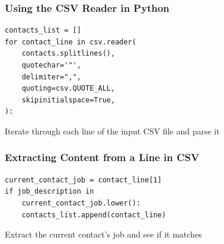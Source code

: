 \documentclass[14pt,aspectratio=169]{beamer}
\begin{document}
%
\begin{frame}[fragile]
  \frametitle{Using the CSV Reader in Python}
  \normalsize
  \begin{minipage}{6in}
    \vspace*{.25in}
    \begin{verbatim}
contacts_list = []
for contact_line in csv.reader(
    contacts.splitlines(),
    quotechar='"',
    delimiter=",",
    quoting=csv.QUOTE_ALL,
    skipinitialspace=True,
):
    \end{verbatim}
  \end{minipage}
  \vspace*{.1in}
  \begin{center}
    \normalsize \noindent Iterate through each line of the input CSV file and
    parse it\\
  \end{center}
\end{frame}

%
\begin{frame}[fragile]
  \frametitle{Extracting Content from a Line in CSV}
  \normalsize
  \begin{minipage}{6in}
    \vspace*{.25in}
    \begin{verbatim}
current_contact_job = contact_line[1]
if job_description in
    current_contact_job.lower():
    contacts_list.append(contact_line)
    \end{verbatim}
  \end{minipage}
  \vspace*{.1in}
  \begin{center}
    \normalsize \noindent Extract the current contact's job and see if it
    matches\\
  \end{center}
\end{frame}
\end{document}
